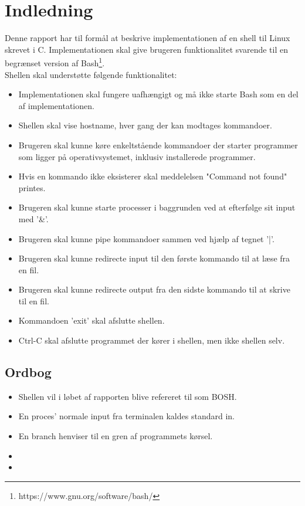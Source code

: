 \section{Indledning}
Denne rapport har til formål at beskrive implementationen af en shell til Linux skrevet i C. Implementationen skal give brugeren funktionalitet svarende til en begrænset version af Bash\footnote{https://www.gnu.org/software/bash/}. \\

Shellen skal understøtte følgende funktionalitet:
\begin{itemize}
	\item Implementationen skal fungere uafhængigt og må ikke starte Bash som en del af implementationen.
	\item Shellen skal vise hostname, hver gang der kan modtages kommandoer.
	\item Brugeren skal kunne køre enkeltstående kommandoer der starter programmer som ligger på operativsystemet, inklusiv installerede programmer.
	\item Hvis en kommando ikke eksisterer skal meddelelsen "Command not found" printes.
	\item Brugeren skal kunne starte processer i baggrunden ved at efterfølge sit input med '\&'.
	\item Brugeren skal kunne pipe kommandoer sammen ved hjælp af tegnet '|'.
	\item Brugeren skal kunne redirecte input til den første kommando til at læse fra en fil.
	\item Brugeren skal kunne redirecte output fra den sidste kommando til at skrive til en fil.
	\item Kommandoen 'exit' skal afslutte shellen.
	\item Ctrl-C skal afslutte programmet der kører i shellen, men ikke shellen selv.
\end{itemize}

\subsection{Ordbog}
\begin{itemize}
	\item Shellen vil i løbet af rapporten blive refereret til som BOSH.
	\item En proces' normale input fra terminalen kaldes standard in.
	\item En branch henviser til en gren af programmets kørsel.
	\item {}
	\item {}
\end{itemize}


